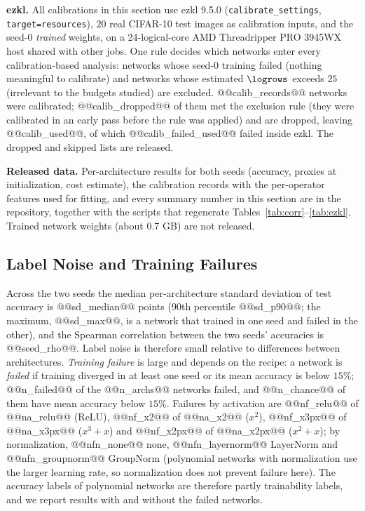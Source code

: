 \textbf{ezkl.}  All calibrations in this section use ezkl 9.5.0 (\texttt{calibrate\_settings}, \texttt{target=resources}), $20$ real CIFAR-10 test images as calibration
inputs, and the seed-0 \emph{trained} weights, on a 24-logical-core AMD Threadripper PRO 3945WX host shared with other jobs.  One rule decides which networks enter every calibration-based analysis: networks whose seed-0 training failed (nothing meaningful to calibrate)
and networks whose estimated $\logrows$ exceeds $25$ (irrelevant to the budgets studied) are excluded.  @@calib_records@@ networks were calibrated; @@calib_dropped@@ of them met the exclusion rule (they were calibrated in an early pass
before the rule was applied) and are dropped, leaving @@calib_used@@, of which @@calib_failed_used@@ failed inside ezkl.  The dropped and skipped lists are released.

\textbf{Released data.}  Per-architecture results for both seeds (accuracy, proxies at initialization, cost estimate), the calibration records with the per-operator
features used for fitting, and every summary number in this section are in the repository, together with the scripts that regenerate Tables~\ref{tab:corr}--\ref{tab:ezkl}.
Trained network weights (about 0.7 GB) are not released.

\subsection{Label Noise and Training Failures}

Across the two seeds the median per-architecture standard deviation of test accuracy is @@sd_median@@ points (90th percentile @@sd_p90@@; the maximum, @@sd_max@@,
is a network that trained in one seed and failed in the other), and the Spearman correlation between the two seeds' accuracies is @@seed_rho@@.
Label noise is therefore small relative to differences between architectures.  \emph{Training failure} is large and depends on the recipe:
a network is \emph{failed} if training diverged in at least one seed or its mean accuracy is below $15\%$; @@n_failed@@ of the @@n_archs@@ networks failed, and @@n_chance@@ of them have mean accuracy below $15\%$.
Failures by activation are @@nf_relu@@ of @@na_relu@@ (ReLU), @@nf_x2@@ of @@na_x2@@ ($x^2$),
@@nf_x3px@@ of @@na_x3px@@ ($x^3{+}x$) and @@nf_x2px@@ of @@na_x2px@@ ($x^2{+}x$); by normalization, @@nfn_none@@ none, @@nfn_layernorm@@ LayerNorm and @@nfn_groupnorm@@ GroupNorm
(polynomial networks with normalization use the larger learning rate, so normalization does not prevent failure here).  The accuracy labels of polynomial networks are therefore
partly trainability labels, and we report results with and without the failed networks.

